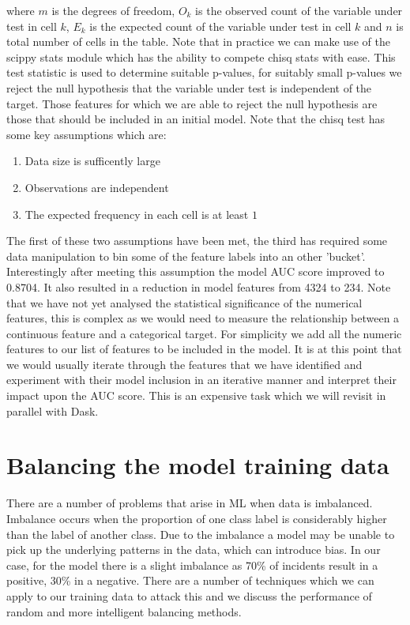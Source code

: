 \documentclass[11pt, oneside]{article}   	%
\begin{document}
where $m$ is the degrees of freedom, $O_k$ is the observed count of the variable under test in cell $k$, $E_k$ is the expected count of the variable under test in cell $k$ and $n$ is total number of cells in the table. Note that in practice we can make use of the scippy stats module which has the ability to compete chisq stats with ease.  This test statistic is used to determine suitable p-values, for suitably small p-values we reject the null hypothesis that the variable under test is independent of the target. Those features for which we are able to reject the null hypothesis are those that should be included in an initial model. Note that the chisq test has some key assumptions which are:
\begin{enumerate}
	\item Data size is sufficently large
	\item Observations are independent
	\item The expected frequency in each cell is at least $1$
\end{enumerate}

The first of these two assumptions have been met, the third has required some data manipulation to bin some of the feature labels into an other 'bucket'. Interestingly after meeting this assumption the model AUC score improved to 0.8704. It also resulted in a reduction in model features from 4324 to 234. Note that we have not yet analysed the statistical significance of the numerical features, this is complex as we would need to measure the relationship between a continuous feature and a categorical target. For simplicity we add all the numeric features to our list of features to be included in the model. It is at this point that we would usually iterate through the features that we have identified and experiment with their model inclusion in an iterative manner and interpret their impact upon the AUC score. This is an expensive task which we will revisit in parallel with Dask.


\section{Balancing the model training data}

There are a number of problems that arise in ML when data is imbalanced. Imbalance occurs when the proportion of one class label is considerably higher than the label of another class. Due to the imbalance a model may be unable to pick up the underlying patterns in the data, which can introduce bias. In our case, for the  model there is a slight imbalance as 70\% of incidents result in a positive, 30\% in a negative. There are a number of techniques which we can apply to our training data to attack this and we discuss the performance of random and more intelligent balancing methods.
\end{document}
